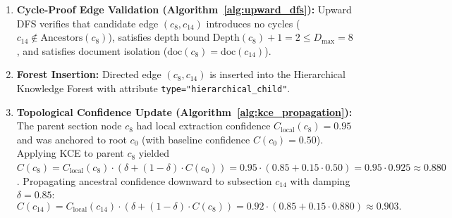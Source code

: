\documentclass[12pt,a4paper]{report}
\begin{document}
\begin{enumerate}
\begin{itemize}
        $\text{Score}(c_8, c_{14}) = 0.40(0.339) + 0.40(0.814) + 0.20(1.0) = 0.661$.
        \item For $c_0$: $S_{\text{struct}} = \frac{1}{1 + \log(1 + |14 - 0|)} = 0.270$; $S_{\text{sem}} = 0.652$; $S_{\text{level}} = 0.80$ ($\Delta = 2$). Composite score:
        $\text{Score}(c_0, c_{14}) = 0.40(0.270) + 0.40(0.652) + 0.20(0.80) = 0.529$.
    \end{itemize}
    Candidate $c_8$ (\textit{``3. System Architecture''}) achieves the winning score and is selected as the candidate parent $u^* = c_8$.
    \item \textbf{Cycle-Proof Edge Validation (Algorithm~\ref{alg:upward_dfs}):} Upward DFS verifies that candidate edge $(c_8, c_{14})$ introduces no cycles ($c_{14} \notin \text{Ancestors}(c_8)$), satisfies depth bound $\text{Depth}(c_8) + 1 = 2 \le D_{\max}=8$, and satisfies document isolation ($\text{doc}(c_8) = \text{doc}(c_{14})$).
    \item \textbf{Forest Insertion:} Directed edge $(c_8, c_{14})$ is inserted into the Hierarchical Knowledge Forest with attribute \texttt{type="hierarchical\_child"}.
    \item \textbf{Topological Confidence Update (Algorithm~\ref{alg:kce_propagation}):} The parent section node $c_8$ had local extraction confidence $C_{\text{local}}(c_8) = 0.95$ and was anchored to root $c_0$ (with baseline confidence $C(c_0) = 0.50$). Applying KCE to parent $c_8$ yielded $C(c_8) = C_{\text{local}}(c_8) \cdot (\delta + (1 - \delta) \cdot C(c_0)) = 0.95 \cdot (0.85 + 0.15 \cdot 0.50) = 0.95 \cdot 0.925 \approx 0.880$. Propagating ancestral confidence downward to subsection $c_{14}$ with damping $\delta = 0.85$:
    \begin{equation*}
    C(c_{14}) = C_{\text{local}}(c_{14}) \cdot (\delta + (1 - \delta) \cdot C(c_8)) = 0.92 \cdot (0.85 + 0.15 \cdot 0.880) \approx 0.903.
    \end{equation*}
\end{enumerate}
\end{document}
